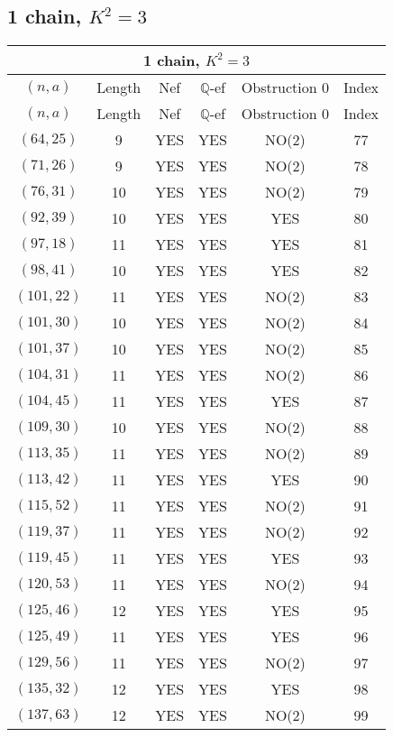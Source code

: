 \subsection{1 chain, $K^2 = 3$}
\begin{longtable}{|c|c|c|c|c|c|}
\hline
\multicolumn{6}{|c|}{1 chain, $K^2 = 3$}\\
\hline
$(n,a)$ & Length & Nef & $\mathbb Q$-ef & Obstruction 0 & Index\\
\hline
\endfirsthead

\hline
$(n,a)$ & Length & Nef & $\mathbb Q$-ef & Obstruction 0 & Index\\
\hline
\endhead
\hline
\endfoot

$(64, 25)$ & 9 & YES & YES & NO(2) & 77\\
$(71, 26)$ & 9 & YES & YES & NO(2) & 78\\
$(76, 31)$ & 10 & YES & YES & NO(2) & 79\\
$(92, 39)$ & 10 & YES & YES & YES & 80\\
$(97, 18)$ & 11 & YES & YES & YES & 81\\
$(98, 41)$ & 10 & YES & YES & YES & 82\\
$(101, 22)$ & 11 & YES & YES & NO(2) & 83\\
$(101, 30)$ & 10 & YES & YES & NO(2) & 84\\
$(101, 37)$ & 10 & YES & YES & NO(2) & 85\\
$(104, 31)$ & 11 & YES & YES & NO(2) & 86\\
$(104, 45)$ & 11 & YES & YES & YES & 87\\
$(109, 30)$ & 10 & YES & YES & NO(2) & 88\\
$(113, 35)$ & 11 & YES & YES & NO(2) & 89\\
$(113, 42)$ & 11 & YES & YES & YES & 90\\
$(115, 52)$ & 11 & YES & YES & NO(2) & 91\\
$(119, 37)$ & 11 & YES & YES & NO(2) & 92\\
$(119, 45)$ & 11 & YES & YES & YES & 93\\
$(120, 53)$ & 11 & YES & YES & NO(2) & 94\\
$(125, 46)$ & 12 & YES & YES & YES & 95\\
$(125, 49)$ & 11 & YES & YES & YES & 96\\
$(129, 56)$ & 11 & YES & YES & NO(2) & 97\\
$(135, 32)$ & 12 & YES & YES & YES & 98\\
$(137, 63)$ & 12 & YES & YES & NO(2) & 99\\

\end{longtable}
